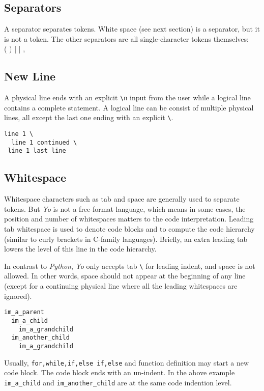 \documentclass[12pt]{article}
\begin{document}
\subsection{Separators} %
A separator separates tokens. White space (see next section) is a separator, but it is not a token. The other separators are all single-character tokens themselves: \\
( ) [ ] , \\

\subsection{New Line}
A physical line ends with an explicit \texttt{\textbackslash n} input from the user while a logical line contains a complete statement. A logical line can be consist of multiple physical lines, all except the last one ending with an explicit \texttt{\textbackslash}.
\begin{lstlisting}[caption=Logical Line Split]
line 1 \
  line 1 continued \
 line 1 last line
\end{lstlisting}


\subsection{Whitespace} %
Whitespace characters such as tab and space are generally used to separate tokens. But \textit{Yo} is not a free-format language, which means in some cases, the position and number of whitespaces matters to the code interpretation. Leading tab whitespace is used to denote code blocks and to compute the code hierarchy (similar to curly brackets in C-family languages). Briefly, an extra leading tab lowers the level of this line in the code hierarchy.%

In contrast to \textit{Python}, \textit{Yo} only accepts tab \texttt{\textbackslash} for leading indent, and space is not allowed. In other words, space should not appear at the beginning of any line (except for a continuing physical line where all the leading whitespaces are ignored).\\
\begin{lstlisting}[caption=Whitespace and blocks]
im_a_parent
  im_a_child
    im_a_grandchild
  im_another_child
    im_a_grandchild
\end{lstlisting}

Usually, \texttt{for,while,if,else if,else} and function definition may start a new code block. The code block ends with an un-indent. In the above example \texttt{im\_a\_child} and \texttt{im\_another\_child} are at the same code indention level.
\end{document}
